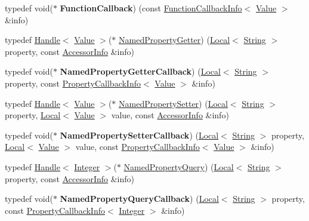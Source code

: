 \begin{DoxyCompactItemize}
\item 
\hypertarget{namespacev8_a9eb0624666bb117aea1fb9c9424dcc1b}{}typedef void($\ast$ {\bfseries Function\+Callback}) (const \hyperlink{classv8_1_1_function_callback_info}{Function\+Callback\+Info}$<$ \hyperlink{classv8_1_1_value}{Value} $>$ \&info)\label{namespacev8_a9eb0624666bb117aea1fb9c9424dcc1b}

\item 
typedef \hyperlink{classv8_1_1_handle}{Handle}$<$ \hyperlink{classv8_1_1_value}{Value} $>$($\ast$ \hyperlink{namespacev8_ab9effde41da1c073eddbd4a11a62bd0b}{Named\+Property\+Getter}) (\hyperlink{classv8_1_1_local}{Local}$<$ \hyperlink{classv8_1_1_string}{String} $>$ property, const \hyperlink{classv8_1_1_accessor_info}{Accessor\+Info} \&info)
\item 
\hypertarget{namespacev8_a50cae386a68bf9ff23d02aa1161face4}{}typedef void($\ast$ {\bfseries Named\+Property\+Getter\+Callback}) (\hyperlink{classv8_1_1_local}{Local}$<$ \hyperlink{classv8_1_1_string}{String} $>$ property, const \hyperlink{classv8_1_1_property_callback_info}{Property\+Callback\+Info}$<$ \hyperlink{classv8_1_1_value}{Value} $>$ \&info)\label{namespacev8_a50cae386a68bf9ff23d02aa1161face4}

\item 
typedef \hyperlink{classv8_1_1_handle}{Handle}$<$ \hyperlink{classv8_1_1_value}{Value} $>$($\ast$ \hyperlink{namespacev8_a682b1fc46feab32605c4905612ffe870}{Named\+Property\+Setter}) (\hyperlink{classv8_1_1_local}{Local}$<$ \hyperlink{classv8_1_1_string}{String} $>$ property, \hyperlink{classv8_1_1_local}{Local}$<$ \hyperlink{classv8_1_1_value}{Value} $>$ value, const \hyperlink{classv8_1_1_accessor_info}{Accessor\+Info} \&info)
\item 
\hypertarget{namespacev8_a9587769513971dc7cb301b740d9e66b6}{}typedef void($\ast$ {\bfseries Named\+Property\+Setter\+Callback}) (\hyperlink{classv8_1_1_local}{Local}$<$ \hyperlink{classv8_1_1_string}{String} $>$ property, \hyperlink{classv8_1_1_local}{Local}$<$ \hyperlink{classv8_1_1_value}{Value} $>$ value, const \hyperlink{classv8_1_1_property_callback_info}{Property\+Callback\+Info}$<$ \hyperlink{classv8_1_1_value}{Value} $>$ \&info)\label{namespacev8_a9587769513971dc7cb301b740d9e66b6}

\item 
typedef \hyperlink{classv8_1_1_handle}{Handle}$<$ \hyperlink{classv8_1_1_integer}{Integer} $>$($\ast$ \hyperlink{namespacev8_a0136e8102c101d9a39497f75daa9153b}{Named\+Property\+Query}) (\hyperlink{classv8_1_1_local}{Local}$<$ \hyperlink{classv8_1_1_string}{String} $>$ property, const \hyperlink{classv8_1_1_accessor_info}{Accessor\+Info} \&info)
\item 
\hypertarget{namespacev8_ac135beae5f0c8b290255accb438f990e}{}typedef void($\ast$ {\bfseries Named\+Property\+Query\+Callback}) (\hyperlink{classv8_1_1_local}{Local}$<$ \hyperlink{classv8_1_1_string}{String} $>$ property, const \hyperlink{classv8_1_1_property_callback_info}{Property\+Callback\+Info}$<$ \hyperlink{classv8_1_1_integer}{Integer} $>$ \&info)\label{namespacev8_ac135beae5f0c8b290255accb438f990e}


\end{DoxyCompactItemize}
